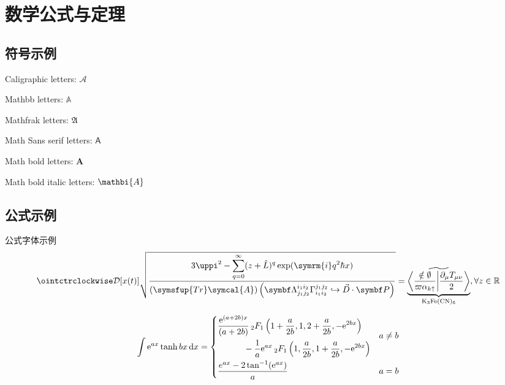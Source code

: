 \chapter{数学公式与定理}

\section{符号示例}

Caligraphic letters: $\mathcal{A}$ 

Mathbb letters: $\mathbb{A}$

Mathfrak letters: $\mathfrak{A}$

Math Sans serif letters: $\mathsf{A}$

Math bold letters: $\mathbf{A}$

Math bold italic letters: $\mathbi{A}$

\section{公式示例}

公式字体示例
\[
    \displaystyle \ointctrclockwise\mathcal{D}[x(t)]\sqrt{\frac{\displaystyle3\uppi^2-\sum_{q=0}^{\infty}(z+\hat L)^{q}\exp(\symrm{i}q^2 \hbar x)}{\displaystyle (\symsfup{Tr}\symcal{A})\left(\symbf\Lambda_{j_1j_2}^{i_1i_2}\Gamma_{i_1i_2}^{j_1j_2}\hookrightarrow\vec D\cdot \symbf P  \right)}}
    =\underbrace{\widetilde{\left\langle \frac{\notin \emptyset}{\varpi\alpha_{k\uparrow}}\middle\vert \frac{\partial_\mu T_{\mu\nu}}{2}\right\rangle}}_{\mathrm{K}_3\mathrm{Fe}(\mathrm{CN})_6} ,\forall z \in \mathbb{R}
\]

\begin{equation}\label{eq:dewitt}
    \int \mathrm{e}^{ax} \tanh {bx} \, \mathrm{d}x =
    \begin{dcases}
        \begin{multlined}
            \frac{\mathrm{e}^{(a+2b)x}}{(a + 2b)} \,
            {{}_2F_1} \left( 1 + \frac{a}{2b}, 1, 2+\frac{a}{2b}, -\mathrm{e}^{2bx} \right) \\
            - \frac{1}{a} \mathrm{e}^{ax} \, {{}_2F_1} \left( 1, \frac{a}{2b}, 1 + \frac{a}{2b}, -\mathrm{e}^{2bx} \right)
        \end{multlined}
        & a \ne b \\
    \frac{e^{ax} - 2 \tan^{-1}(\mathrm{e}^{ax})}{a} & a = b
  \end{dcases}
\end{equation}

